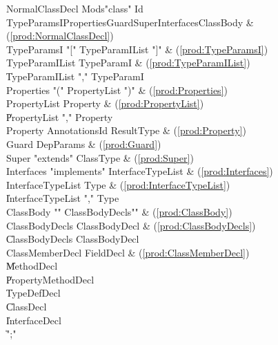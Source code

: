 \begin{bbgrammar}
     NormalClassDecl \: Mods\opt \xcd"class" Id TypeParamsI\opt Properties\opt Guard\opt Super\opt Interfaces\opt ClassBody & (\ref{prod:NormalClassDecl}) \\
         TypeParamsI \: \xcd"[" TypeParamIList \xcd"]" & (\ref{prod:TypeParamsI}) \\
      TypeParamIList \: TypeParamI & (\ref{prod:TypeParamIList}) \\
                     \| TypeParamIList \xcd"," TypeParamI \\
          Properties \: \xcd"(" PropertyList \xcd")" & (\ref{prod:Properties}) \\
        PropertyList \: Property & (\ref{prod:PropertyList}) \\
                     \| PropertyList \xcd"," Property \\
            Property \: Annotations\opt Id ResultType & (\ref{prod:Property}) \\
               Guard \: DepParams & (\ref{prod:Guard}) \\
               Super \: \xcd"extends" ClassType & (\ref{prod:Super}) \\
          Interfaces \: \xcd"implements" InterfaceTypeList & (\ref{prod:Interfaces}) \\
   InterfaceTypeList \: Type & (\ref{prod:InterfaceTypeList}) \\
                     \| InterfaceTypeList \xcd"," Type \\
           ClassBody \: \xcd"{" ClassBodyDecls\opt \xcd"}" & (\ref{prod:ClassBody}) \\
      ClassBodyDecls \: ClassBodyDecl & (\ref{prod:ClassBodyDecls}) \\
                     \| ClassBodyDecls ClassBodyDecl \\
     ClassMemberDecl \: FieldDecl & (\ref{prod:ClassMemberDecl}) \\
                     \| MethodDecl \\
                     \| PropertyMethodDecl \\
                     \| TypeDefDecl \\
                     \| ClassDecl \\
                     \| InterfaceDecl \\
                     \| \xcd";" \\
\end{bbgrammar}




